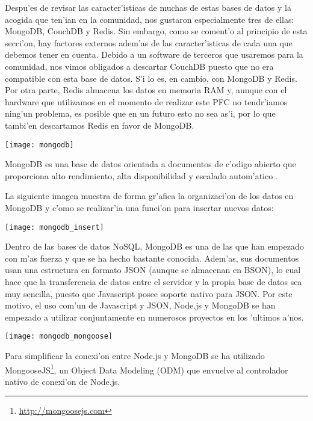 Despu'es de revisar las caracter'isticas de muchas de estas bases de datos y la acogida que ten'ian en la
comunidad, nos gustaron especialmente tres
de ellas: MongoDB, CouchDB y Redis. Sin embargo, como se coment'o al principio de esta secci'on, hay factores
externos adem'as de las caracter'isticas de cada una que debemos tener en cuenta. Debido a un software de terceros
que usaremos para la comunidad, nos vimos obligados a descartar CouchDB puesto que no era compatible con esta base de datos.
S'i lo es, en cambio, con MongoDB y Redis. Por otra parte, Redis almacena los datos en memoria RAM y, aunque
con el hardware que utilizamos en el momento de realizar este PFC no tendr'iamos ning'un problema, es posible
que en un futuro esto no sea as'i, por lo que tambi'en descartamos Redis en favor de MongoDB.


\begin{center}
\texttt{[image: mongodb]}
\end{center}

MongoDB es una base de datos orientada a documentos de c'odigo abierto que proporciona alto rendimiento,
alta disponibilidad y escalado autom'atico \cite{mongodbmanual}.

La siguiente imagen muestra de forma gr'afica la organizaci'on de los datos en MongoDB y c'omo se realizar'ia
una funci'on para insertar nuevos datos\cite{mongodbmanual}:

\begin{center}
\texttt{[image: mongodb\_insert]}
\end{center}

Dentro de las bases de datos NoSQL, MongoDB es una de las que han empezado con m'as fuerza
y que se ha hecho bastante conocida. Adem'as, sus documentos usan una estructura en formato
JSON (aunque se almacenan en BSON), lo cual hace que la transferencia de datos entre el servidor
y la propia base de datos sea muy sencilla, puesto que Javascript posee soporte nativo para JSON.
Por este motivo, el uso com'un de Javascript y JSON, Node.js y MongoDB se han empezado a utilizar
conjuntamente en numerosos proyectos en los 'ultimos a'nos.


\begin{center}
\texttt{[image: mongodb\_mongoose]}
\end{center}

Para simplificar la conexi'on entre Node.js y MongoDB se ha utilizado MongooseJS\footnote{\url{http://mongoosejs.com}}, un
Object Data Modeling (ODM) que envuelve al controlador nativo de conexi'on de Node.js.

